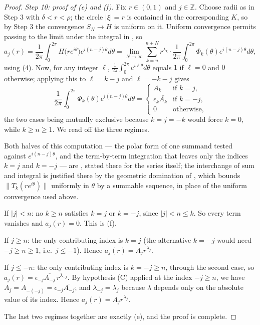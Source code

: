\begin{proof}
\emph{Step 10: proof of (e) and (f).}  Fix $r\in(0,1)$ and $j\in\mathbb{Z}$.
Choose radii as in Step 3 with $\delta<r<\rho$; the circle $|\xi|=r$ is
contained in the corresponding $K$, so by Step 3 the convergence $S_N\to H$ is
uniform on it.
Uniform convergence permits passing to the limit under the integral in
, so
\[
  a_j(r)=\frac1{2\pi}\int_0^{2\pi}H\bigl(re^{i\theta}\bigr)e^{i(n-j)\theta}d\theta
  =\lim_{N\to\infty}\sum_{k=n}^{n+N}r^{\lambda_k}\cdot
    \frac1{2\pi}\int_0^{2\pi}\Phi_k(\theta)e^{i(n-j)\theta}d\theta ,
\]
using (4).  Now, for any integer $\ell$,
$\frac1{2\pi}\int_0^{2\pi}e^{i\ell\theta}d\theta$ equals $1$ if $\ell=0$ and
$0$ otherwise; applying this to $\ell=k-j$ and $\ell=-k-j$ gives
\[
  \frac1{2\pi}\int_0^{2\pi}\Phi_k(\theta)e^{i(n-j)\theta}d\theta
  =\begin{cases}
    A_k&\text{if }k=j,\\
    \epsilon_k\overline{A_k}&\text{if }k=-j,\\
    0&\text{otherwise,}
  \end{cases}
\]
the two cases being mutually exclusive because $k=j=-k$ would force $k=0$,
while $k\ge n\ge1$.  We read off the three regimes.

Both halves of this computation --- the polar form of one summand tested
against $e^{i(n-j)\theta}$, and the term-by-term integration that leaves only
the indices $k=j$ and $k=-j$ --- are ,
stated there for the series itself; the interchange of sum and integral is
justified there by the geometric domination of
, which bounds
$\|T_{k}(re^{i\theta})\|$ uniformly in $\theta$ by a summable sequence, in place
of the uniform convergence used above.

If $|j|<n$: no $k\ge n$ satisfies $k=j$ or $k=-j$, since $|j|<n\le k$.  So
every term vanishes and $a_j(r)=0$.  This is (f).

If $j\ge n$: the only contributing index is $k=j$ (the alternative $k=-j$ would
need $-j\ge n\ge1$, i.e.\ $j\le-1$).  Hence $a_j(r)=A_jr^{\lambda_j}$.

If $j\le-n$: the only contributing index is $k=-j\ge n$, through the second
case, so $a_j(r)=\epsilon_{-j}\overline{A_{-j}}\,r^{\lambda_{-j}}$.  By
hypothesis (C) applied at the index $-j\ge n$, we have
$A_{j}=A_{-(-j)}=\epsilon_{-j}\overline{A_{-j}}$; and $\lambda_{-j}=\lambda_j$
because $\lambda$ depends only on the absolute value of its index.  Hence
$a_j(r)=A_jr^{\lambda_j}$.

The last two regimes together are exactly (e), and the proof is complete.
\end{proof}
